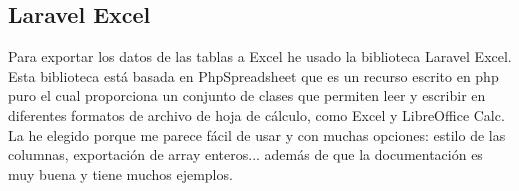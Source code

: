 \subsection{Laravel Excel}
Para exportar los datos de las tablas a Excel he usado la biblioteca Laravel Excel.
Esta biblioteca está basada en PhpSpreadsheet que es un recurso escrito en php puro el cual proporciona un conjunto de clases que permiten leer y escribir en diferentes formatos de archivo de hoja de cálculo, como Excel y LibreOffice Calc.\cite{LaravelExcel}\\
La he elegido porque me parece fácil de usar y con muchas opciones: estilo de las columnas, exportación de array enteros... además de que la documentación es muy buena y tiene muchos ejemplos.